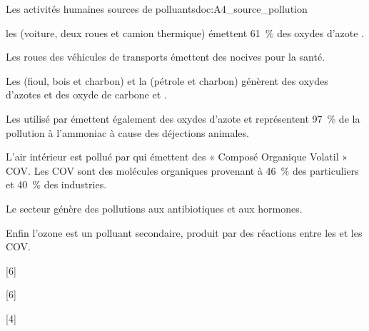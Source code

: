 \begin{doc}{Les activités humaines sources de polluants}{doc:A4_source_pollution}
  \begin{listePoints}
    \item les  (voiture, deux roues et camion thermique) émettent \qty{61}{\percent} des oxydes d'azote .
    \item Les roues des véhicules de transports émettent des  nocives pour la santé.
    \item Les  (fioul, bois et charbon) et la  (pétrole et charbon) génèrent des oxydes d'azotes  et des oxyde de carbone  et .
    \item Les  utilisé par  émettent également des oxydes d'azote  et représentent \qty{97}{\percent} de la pollution à l'ammoniac  à cause des déjections animales.
    \item L'air intérieur est pollué par  qui émettent des « Composé Organique Volatil » COV.
    Les COV sont des molécules organiques provenant à \qty{46}{\percent} des particuliers et \qty{40}{\percent} des industries.
    \item Le secteur  génère des pollutions aux antibiotiques et aux hormones.
    \item Enfin l'ozone est un polluant secondaire, produit par des réactions entre les  et les COV.
  \end{listePoints}
\end{doc}

[6]

[6]

[4]

